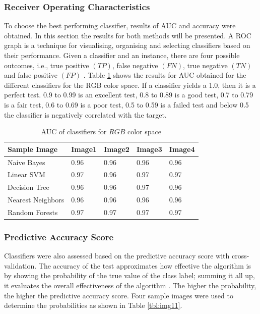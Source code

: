 \documentclass[conference]{IEEEtran}
\begin{document}
\subsubsection{Receiver Operating Characteristics}
To choose the best performing classifier, results of AUC and accuracy were obtained. In this section the results for both methods will be presented. A ROC graph is a technique for visualising, organising and selecting classifiers based on their performance. Given a classifier and an instance, there are four possible outcomes, i.e., true positive $(TP)$, false negative $(FN)$, true negative $(TN)$ and false positive $(FP)$ \cite{fawcett2006introduction}. Table \ref{tbl:img1} shows the results for AUC obtained for the different classifiers for the RGB color space. If a classifier yields a 1.0, then it is a perfect test. 0.9 to 0.99 is an excellent test, 0.8 to 0.89 is a good test, 0.7 to 0.79 is a fair test, 0.6 to 0.69 is a poor test, 0.5 to 0.59 is a failed test and below 0.5 the classifier is negatively correlated with the target.
\begin{table}[t!]
\renewcommand{\arraystretch}{1.3}
\caption{AUC of classifiers for $RGB$ color space }
\centering
    \begin{tabular}{|l|l|l|l|l|}
      \hline
      Sample Image &Image1 &Image2 & Image3 & Image4 \\ \hline

      Naive Bayes & 0.96  & 0.96 & 0.96 & 0.96 \\    \hline
      Linear SVM & 0.97  & 0.96 & 0.97 & 0.97 \\      \hline
      Decision Tree & 0.96  & 0.96 & 0.97 & 0.96 \\      \hline
      Nearest Neighbors & 0.96  & 0.96 & 0.96 & 0.96 \\      \hline
      Random Forests & 0.97  & 0.97& 0.97 & 0.97 \\      \hline
     \end{tabular}
    \label{tbl:img1}
\end{table}

\subsubsection{Predictive Accuracy Score}
Classifiers were also assessed based on the predictive accuracy score with cross-validation. The accuracy of the test approximates how effective the algorithm is by showing the probability of the true value of the class label; summing it all up, it evaluates the overall effectiveness of the algorithm \cite{sokolova2006beyond}. The higher the probability, the higher the predictive accuracy score. Four sample images were used to determine the probabilities as shown in Table \ref{tbl:img11}.
\end{document}
